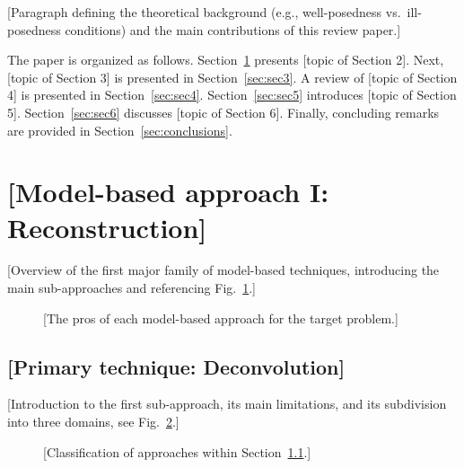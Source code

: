 \documentclass[final,5p,times,twocolumn]{elsarticle}
\begin{document}
[Paragraph defining the theoretical background (e.g., well-posedness vs.\ ill-posedness conditions) and the main contributions of this review paper.]

The paper is organized as follows. Section~\ref{sec:sec2} presents [topic of Section 2]. Next, [topic of Section 3] is presented in Section~\ref{sec:sec3}. A review of [topic of Section 4] is presented in Section~\ref{sec:sec4}. Section~\ref{sec:sec5} introduces [topic of Section 5]. Section~\ref{sec:sec6} discusses [topic of Section 6]. Finally, concluding remarks are provided in Section~\ref{sec:conclusions}.

\section{[Model-based approach I: Reconstruction]}\label{sec:sec2}

[Overview of the first major family of model-based techniques, introducing the main sub-approaches and referencing Fig.~\ref{fig:sec2_pros}.]

\begin{figure}[t]
    \centering
    \caption{[The pros of each model-based approach for the target problem.]}
    \label{fig:sec2_pros}
\end{figure}

\subsection{[Primary technique: Deconvolution]}\label{subsec:sec2_1}

[Introduction to the first sub-approach, its main limitations, and its subdivision into three domains, see Fig.~\ref{fig:sec2_class}.]

\begin{figure}[t]
    \centering
    \caption{[Classification of approaches within Section~\ref{subsec:sec2_1}.]}
    \label{fig:sec2_class}
\end{figure}
\end{document}
